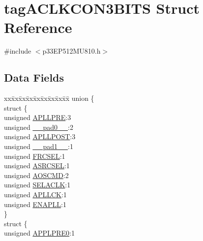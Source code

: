 \hypertarget{structtag_a_c_l_k_c_o_n3_b_i_t_s}{}\section{tag\+A\+C\+L\+K\+C\+O\+N3\+B\+I\+TS Struct Reference}
\label{structtag_a_c_l_k_c_o_n3_b_i_t_s}


{\ttfamily \#include $<$p33\+E\+P512\+M\+U810.\+h$>$}

\subsection*{Data Fields}
\begin{DoxyCompactItemize}
\item 
\begin{tabbing}
xx\=xx\=xx\=xx\=xx\=xx\=xx\=xx\=xx\=\kill
union \{\\
\>struct \{\\
\>\>unsigned \hyperlink{structtag_a_c_l_k_c_o_n3_b_i_t_s_ae79ba91da41af3927ffd56004d0ef3fe}{APLLPRE}:3\\
\>\>unsigned \hyperlink{structtag_a_c_l_k_c_o_n3_b_i_t_s_adf71f3d8410c1f1dbbc96680a92c49af}{\_\_pad0\_\_}:2\\
\>\>unsigned \hyperlink{structtag_a_c_l_k_c_o_n3_b_i_t_s_ae727195cca855701d9a0b9e1b268fd99}{APLLPOST}:3\\
\>\>unsigned \hyperlink{structtag_a_c_l_k_c_o_n3_b_i_t_s_acaf2d0924a107ec6e8d2e31febaf66f9}{\_\_pad1\_\_}:1\\
\>\>unsigned \hyperlink{structtag_a_c_l_k_c_o_n3_b_i_t_s_a4d164102564cf4ab94d34ad577e7bd39}{FRCSEL}:1\\
\>\>unsigned \hyperlink{structtag_a_c_l_k_c_o_n3_b_i_t_s_ad0fda1fad7c6cf5181060f9f5b5d18a6}{ASRCSEL}:1\\
\>\>unsigned \hyperlink{structtag_a_c_l_k_c_o_n3_b_i_t_s_af2ae2b6087e28798f0390286bb117449}{AOSCMD}:2\\
\>\>unsigned \hyperlink{structtag_a_c_l_k_c_o_n3_b_i_t_s_aef06a2deb781b3085fc4a336124a60df}{SELACLK}:1\\
\>\>unsigned \hyperlink{structtag_a_c_l_k_c_o_n3_b_i_t_s_a4fb139671d71527df93b342f3a4fd9b5}{APLLCK}:1\\
\>\>unsigned \hyperlink{structtag_a_c_l_k_c_o_n3_b_i_t_s_ae554f248d9b95b71bca58c5ccbec7ffe}{ENAPLL}:1\\
\>\} \\
\>struct \{\\
\>\>unsigned \hyperlink{structtag_a_c_l_k_c_o_n3_b_i_t_s_a6d7d220a18e87fb64f2aa144ca6f250e}{APPLPRE0}:1\\

\end{tabbing}
\end{DoxyCompactItemize}
